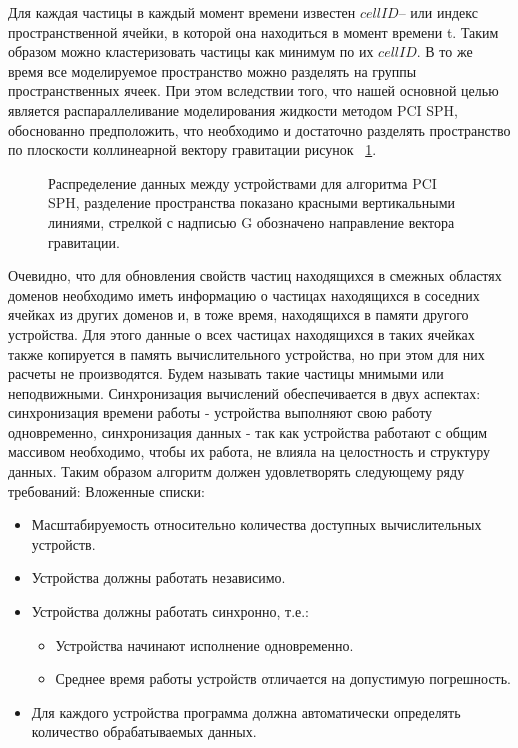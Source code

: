 Для каждая частицы в каждый момент времени известен \(cellID\)– или индекс пространственной ячейки, в которой она находиться  в момент времени t. Таким образом можно кластеризовать частицы как минимум по их \(cellID\). В то же время все моделируемое пространство можно разделять на группы пространственных ячеек. При этом вследствии  того, что нашей основной целью является распараллеливание моделирования жидкости методом PCI SPH, обоснованно предположить, что необходимо и достаточно разделять пространство по плоскости коллинеарной вектору гравитации рисунок ~\ref{fig:dstr_1}.
\begin{figure}[ht]
  \caption{Распределение данных между устройствами для алгоритма PCI SPH, разделение пространства показано красными вертикальными линиями, стрелкой с надписью G обозначено направление вектора гравитации.}
  \label{fig:dstr_1}
\end{figure}

Очевидно, что для обновления свойств частиц находящихся в смежных областях доменов необходимо иметь информацию о частицах находящихся в соседних ячейках из других доменов и, в тоже время, находящихся в памяти другого устройства. Для этого данные о всех частицах находящихся в таких ячейках также копируется в память вычислительного устройства, но при этом для них расчеты не производятся. Будем называть такие частицы мнимыми или неподвижными. 
Синхронизация вычислений обеспечивается в двух аспектах: синхронизация времени работы - устройства выполняют свою работу одновременно, синхронизация данных - так как устройства работают с общим массивом необходимо, чтобы их работа, не влияла на целостность и структуру данных. Таким образом алгоритм должен удовлетворять следующему ряду требований:
\noindent Вложенные списки:
\begin{itemize}
  \item Масштабируемость относительно количества доступных вычислительных устройств.
  \item Устройства должны работать независимо.
  \item Устройства должны работать синхронно, т.е.: 
    \begin{itemize}
       \item Устройства начинают исполнение  одновременно. 
       \item Среднее время работы устройств отличается на допустимую погрешность.
    \end{itemize}
  \item Для каждого устройства программа должна автоматически определять количество обрабатываемых данных.
\end{itemize}

